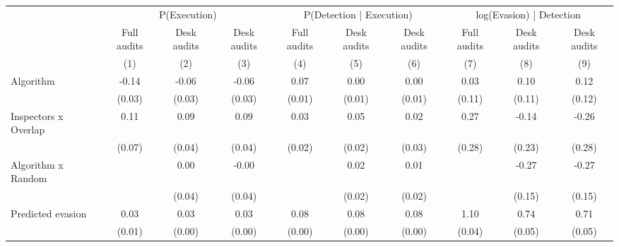 \begin{tabular}{lccc|ccc|ccc} \toprule
\multicolumn{1}{l}{} & \multicolumn{3}{c}{P(Execution)} & \multicolumn{3}{c}{P(Detection | Execution)} & \multicolumn{3}{c}{log(Evasion) | Detection} \\\cmidrule(lr){2-4}\cmidrule(lr){5-7}\cmidrule(lr){8-10} \multicolumn{1}{l}{} & Full audits & Desk audits & Desk audits & Full audits & Desk audits & Desk audits & Full audits & Desk audits & Desk audits \\ \multicolumn{1}{l}{} & (1) & (2) & (3) & (4) & (5) & (6) & (7) & (8) & (9) \\ \midrule
Algorithm   &       -0.14\sym{***}&       -0.06\sym{**} &       -0.06\sym{**} &        0.07\sym{***}&        0.00         &        0.00         &        0.03         &        0.10         &        0.12         \\
            &      (0.03)         &      (0.03)         &      (0.03)         &      (0.01)         &      (0.01)         &      (0.01)         &      (0.11)         &      (0.11)         &      (0.12)         \\
\addlinespace
Inspectors x Overlap&        0.11         &        0.09\sym{**} &        0.09\sym{**} &        0.03         &        0.05\sym{**} &        0.02         &        0.27         &       -0.14         &       -0.26         \\
            &      (0.07)         &      (0.04)         &      (0.04)         &      (0.02)         &      (0.02)         &      (0.03)         &      (0.28)         &      (0.23)         &      (0.28)         \\
\addlinespace
Algorithm x Random&                     &        0.00         &       -0.00         &                     &        0.02         &        0.01         &                     &       -0.27\sym{*}  &       -0.27\sym{*}  \\
            &                     &      (0.04)         &      (0.04)         &                     &      (0.02)         &      (0.02)         &                     &      (0.15)         &      (0.15)         \\
\addlinespace
Predicted evasion&        0.03\sym{***}&        0.03\sym{***}&        0.03\sym{***}&        0.08\sym{***}&        0.08\sym{***}&        0.08\sym{***}&        1.10\sym{***}&        0.74\sym{***}&        0.71\sym{***}\\
            &      (0.01)         &      (0.00)         &      (0.00)         &      (0.00)         &      (0.00)         &      (0.00)         &      (0.04)         &      (0.05)         &      (0.05)         \\

\end{tabular}
